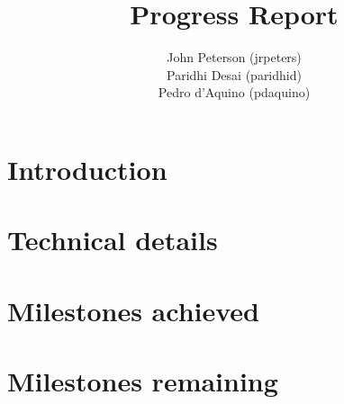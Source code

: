 \documentclass[12pt]{article}
\title{Progress Report}
\author{
	John Peterson (jrpeters)\\
	Paridhi Desai (paridhid)\\
	Pedro d'Aquino (pdaquino)}
\begin{document}
\maketitle

\section{Introduction}

\section{Technical details}

\section{Milestones achieved}

\section{Milestones remaining}
\end{document}
